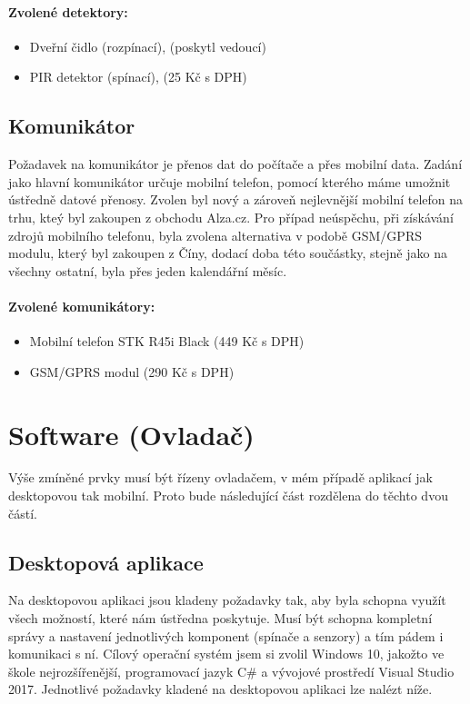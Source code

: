 \documentclass[FM,MP]{tulthesis}  %
\begin{document}
\paragraph{Zvolené detektory:}
\begin{itemize}
\item Dveřní čidlo (rozpínací), (poskytl vedoucí)
\item PIR detektor (spínací), (25 Kč s DPH)
\end{itemize} 

\subsection{Komunikátor}
Požadavek na komunikátor je přenos dat do počítače a přes mobilní data. Zadání jako hlavní komunikátor určuje mobilní telefon, pomocí kterého máme umožnit ústředně datové přenosy. Zvolen byl nový a zároveň nejlevnější mobilní telefon na trhu, kteý byl zakoupen z obchodu Alza.cz. Pro případ neúspěchu, při získávání zdrojů mobilního telefonu, byla zvolena alternativa v podobě GSM/GPRS modulu, který byl zakoupen z Číny, dodací doba této součástky, stejně jako na všechny ostatní, byla přes jeden kalendářní měsíc.

\paragraph{Zvolené komunikátory:}
\begin{itemize}
\item Mobilní telefon STK R45i Black (449 Kč s DPH)
\item GSM/GPRS modul (290 Kč s DPH)
\end{itemize} 

\section{Software (Ovladač)}
Výše zmíněné prvky musí  být řízeny ovladačem, v mém případě aplikací jak desktopovou tak mobilní. Proto bude následující část rozdělena do těchto dvou částí.

\subsection{Desktopová aplikace}
Na desktopovou aplikaci jsou kladeny požadavky tak, aby byla schopna využít všech možností, které nám ústředna poskytuje. Musí být schopna kompletní správy a nastavení jednotlivých komponent (spínače a senzory) a tím pádem i komunikaci s ní. Cílový operační systém jsem si zvolil Windows 10, jakožto ve škole nejrozšířenější, programovací jazyk C\# a vývojové prostředí Visual Studio 2017. Jednotlivé požadavky kladené na desktopovou aplikaci lze nalézt níže.
\end{document}
